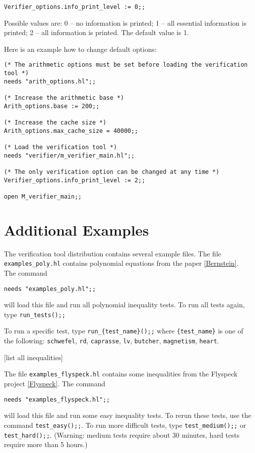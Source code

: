 \documentclass[a4paper]{article}
\begin{document}
\verb|Verifier_options.info_print_level := 0;;|

Possible values are: 0 -- no information is printed; 1 -- all essential information is printed; 2 -- all information is printed. The default value is 1.

Here is an example how to change default options:
\begin{verbatim}
(* The arithmetic options must be set before loading the verification tool *)
needs "arith_options.hl";;

(* Increase the arithmetic base *)
Arith_options.base := 200;;

(* Increase the cache size *)
Arith_options.max_cache_size = 40000;;

(* Load the verification tool *)
needs "verifier/m_verifier_main.hl";;

(* The only verification option can be changed at any time *)
Verifier_options.info_print_level := 2;;

open M_verifier_main;;
\end{verbatim}

\section{Additional Examples}
The verification tool distribution contains several example files. The file \verb|examples_poly.hl| contains polynomial equations from the paper \ref{Bernstein}. The command

\verb|needs "examples_poly.hl";;|

will load this file and run all polynomial inequality tests. To run all tests again, type \verb|run_tests();;|

To run a specific test, type \verb|run_{test_name}();;| where \verb|{test_name}| is one of the following: \verb|schwefel|, \verb|rd|, \verb|caprasse|, \verb|lv|, \verb|butcher|, \verb|magnetism|, \verb|heart|.

[list all inequalities]

The file \verb|examples_flyspeck.hl| contains some inequalities from the Flyspeck project \ref{Flyspeck}. The command

\verb|needs "examples_flyspeck.hl";;|

will load this file and run some easy inequality tests. To rerun these tests, use the command \verb|test_easy();;|. To run more difficult tests, type \verb|test_medium();;| or \verb|test_hard();;|.
(Warning: medium tests require about 30 minutes, hard tests require more than 5 hours.)
\end{document}
